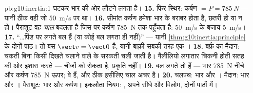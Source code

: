 \begin{solution}{pb:g10:inertia:1}
घटकर भार की ओर लौटने लगता है।
\textbf{15.} फिर स्थिर: कर्षण $= P = \qty{785}{N}$ --- यानी ठीक वही जो \qty{50}{m/s} पर
था।
\textbf{16.} सीमांत कर्षण हमेशा भार के बराबर होता है, छतरी हो
या न हो। पैराशूट वह \emph{चाल} बदलता है जिस पर कर्षण \qty{785}{N} तक पहुँचता
है: \qty{50}{m/s} के बजाय \qty{5}{m/s}।
\textbf{17.} ``\dots पिंड पर लगते बल  हैं
(या कोई बल लगता ही नहीं)'' --- यानी \cref{thm:g10:inertia:principle} के दोनों पाठ।  तो बस
$\vect v = \vect 0$ है, यानी बाक़ी सबकी तरह एक ।
\textbf{18.} बर्फ़ का मैदान: चकती बिना किसी दिखते चलाने वाले के सरकती
चली जाती है। गैलीलियो लगातार चिकनी होती सतह की ओर इशारा करते ---
चीज़ों को  रोकता है, प्रकृति नहीं।
\textbf{19.} बल लगते तो हैं --- भार \qty{785}{N} नीचे और
कर्षण \qty{785}{N} ऊपर; वे \emph{} हैं, और ठीक इसीलिए चाल
अचर है।
\textbf{20.} चलपथ: भार और । मैदान:
भार और । पैराशूट: भार और
कर्षण। इकलौता नियम: , अपने सीधे और विलोम, दोनों पाठों
में।
\end{solution}
